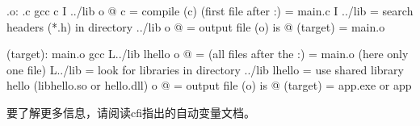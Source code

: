 \documentclass[letterpaper,12pt,english]{sphinxmanual}
\begin{document}
\begin{enumerate}
\begin{sphinxVerbatim}[commandchars=\\\{\}]
\PYGZpc{}.o: \PYGZpc{}.c
    gcc  \PYGZhy{}c \PYGZdl{}\PYGZlt{} \PYGZhy{}I ../lib  \PYGZhy{}o \PYGZdl{}@
    \PYGZsh{} \PYGZhy{}c \PYGZdl{}\PYGZlt{}     =\PYGZgt{} compile (\PYGZhy{}c) \PYGZdl{}\PYGZlt{} (first file after :) = main.c
    \PYGZsh{} \PYGZhy{}I ../lib =\PYGZgt{} search headers (*.h) in directory ../lib
    \PYGZsh{} \PYGZhy{}o \PYGZdl{}@     =\PYGZgt{} output file (\PYGZhy{}o) is \PYGZdl{}@ (target) = main.o

\PYGZdl{}(target): main.o
    gcc  \PYGZdl{}\PYGZca{}  \PYGZhy{}L../lib  \PYGZhy{}lhello  \PYGZhy{}o \PYGZdl{}@
    \PYGZsh{} \PYGZdl{}\PYGZca{}       =\PYGZgt{} \PYGZdl{}\PYGZca{} (all files after the :) = main.o (here only one file)
    \PYGZsh{} \PYGZhy{}L../lib =\PYGZgt{} look for libraries in directory ../lib
    \PYGZsh{} \PYGZhy{}lhello  =\PYGZgt{} use shared library hello (libhello.so or hello.dll)
    \PYGZsh{} \PYGZhy{}o \PYGZdl{}@    =\PYGZgt{} output file (\PYGZhy{}o) is \PYGZdl{}@ (target) = \PYGZdq{}app.exe\PYGZdq{} or \PYGZdq{}app\PYGZdq{}
\end{sphinxVerbatim}

\end{enumerate}

要了解更多信息，请阅读cfi指出的自动变量文档。
\end{document}
